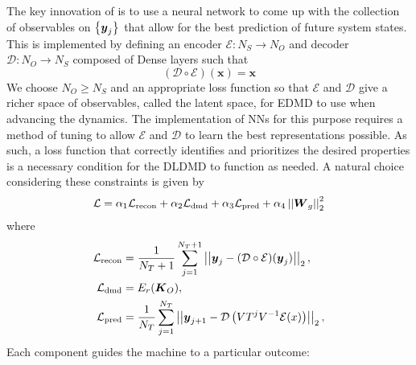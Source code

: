 The key innovation of 
\cite{lago} is to use a neural network to come up with the collection of 
observables on $\left\{\boldsymbol{y}_j\right\}$ that allow for the best prediction 
of future system states. This is implemented by defining an encoder 
$\mathcal{E}: N_S \to N_O$ and decoder $\mathcal{D}: N_O \to N_S$ composed of 
Dense layers such that 
$$(\mathcal{D}\circ\mathcal{E})(\boldsymbol{x}) = \boldsymbol{x}$$
We choose $N_O \geq N_S$ and an appropriate loss function so that 
$\mathcal{E}$ and $\mathcal{D}$ give a richer space of observables, called the 
latent space, for EDMD to use when advancing the dynamics. The implementation 
of NNs for this purpose requires a method of tuning to allow $\mathcal{E}$ and 
$\mathcal{D}$ to learn the best representations possible. As such, a loss 
function that correctly identifies and prioritizes the desired properties is 
a necessary condition for the DLDMD to function as needed. A natural choice
considering these constraints is given by
$$\mathcal{L} = \alpha_1 \mathcal{L}_{\text{recon}} + \alpha_2 \mathcal{L}
_{\text{dmd}} + \alpha_3 \mathcal{L}_{\text{pred}} +\alpha_4 
\left|\left|\boldsymbol{W}_g\right|\right|_2^2$$
where 
\begin{align*}
    \mathcal{L}_{\text{recon}} &= \frac{1}{N_T + 1}\sum_{j=1}^{N_T+1}\left|\left|\boldsymbol{y}_j - 
    (\mathcal{D}\circ\mathcal{E})(\boldsymbol{y}_j)\right|\right|_2, \\
    \mathcal{L}_{\text{dmd}} &= E_r(\boldsymbol{K}_O), \\
    \mathcal{L}_{\text{pred}} &= \frac{1}{N_T}\sum_{j=1}^{N_T}\left|\left|\boldsymbol{y}_{j+1} - 
    \mathcal{D}\left(VT^j V^{-1}\mathcal{E}(x)\right)\right|\right|_2,
\end{align*}
Each component guides the machine to a particular outcome: 
